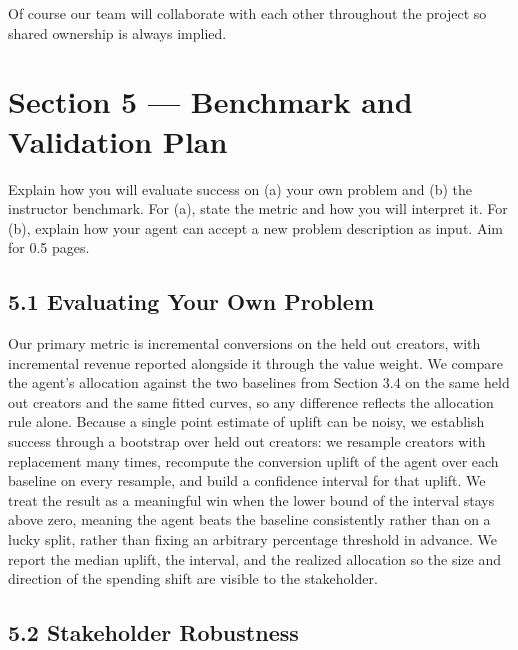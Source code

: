 \documentclass[11pt]{article}
\begin{document}
\vspace{4pt}
Of course our team will collaborate with each other throughout the project so shared ownership is always implied.


\section{Section 5 — Benchmark and Validation Plan}

\begin{hint}
  Explain how you will evaluate success on (a) your own problem and (b) the
  instructor benchmark. For (a), state the metric and how you will interpret
  it. For (b), explain how your agent can accept a new problem description as
  input. Aim for 0.5 pages.
\end{hint}


\subsection*{5.1 \; Evaluating Your Own Problem}

Our primary metric is incremental conversions on the held out creators, with incremental revenue reported alongside it through the value weight. We compare the agent's allocation against the two baselines from Section 3.4 on the same held out creators and the same fitted curves, so any difference reflects the allocation rule alone. Because a single point estimate of uplift can be noisy, we establish success through a bootstrap over held out creators: we resample creators with replacement many times, recompute the conversion uplift of the agent over each baseline on every resample, and build a confidence interval for that uplift. We treat the result as a meaningful win when the lower bound of the interval stays above zero, meaning the agent beats the baseline consistently rather than on a lucky split, rather than fixing an arbitrary percentage threshold in advance. We report the median uplift, the interval, and the realized allocation so the size and direction of the spending shift are visible to the stakeholder.

\subsection*{5.2 \; Stakeholder Robustness}
\end{document}
